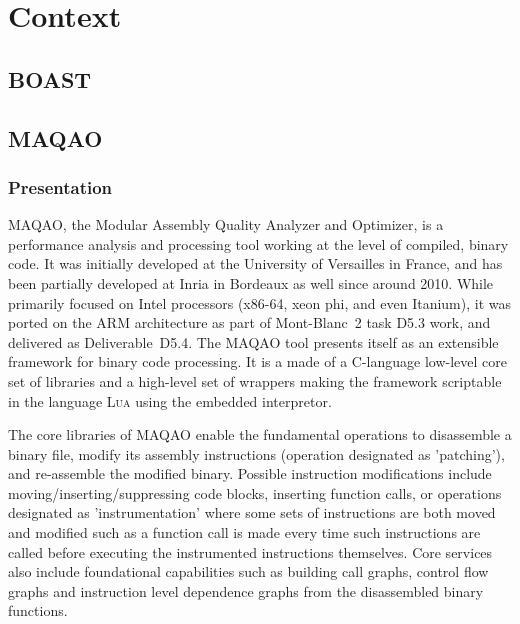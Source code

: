 \documentclass[11pt, a4paper, twoside]{montblanc2}
\def\lua{\textsc{Lua}\xspace}
\begin{document}
\section{Context}\label{sec:context}

\subsection{BOAST}



\subsection{MAQAO}

\subsubsection{Presentation}
MAQAO, the Modular Assembly Quality Analyzer and Optimizer, is a performance analysis and processing 
tool working at the level of compiled, binary code. It was initially developed at the University of 
Versailles in France, and has been partially developed at Inria in Bordeaux as well since around 
2010. While primarily focused on Intel processors (x86-64, xeon phi, and even Itanium), it was 
ported on the ARM architecture as part of Mont-Blanc~2 task D5.3 work, and delivered as 
Deliverable~D5.4. The MAQAO tool presents itself as an extensible framework for binary code 
processing. It is a made of a C-language low-level core set of libraries and a high-level set of 
wrappers making the framework scriptable in the language \lua using the embedded interpretor. 

The core libraries of MAQAO enable the fundamental operations to disassemble a binary file, modify 
its assembly instructions (operation designated as 'patching'), and re-assemble the modified binary. 
Possible instruction modifications include moving/inserting/suppressing code blocks, inserting 
function calls, or operations designated as 'instrumentation' where some sets of instructions are 
both moved and modified such as a function call is made every time such instructions are called 
before executing the instrumented instructions themselves. Core services also include foundational 
capabilities such as building call graphs, control flow graphs and instruction 
level dependence graphs from the disassembled binary functions.
\end{document}
